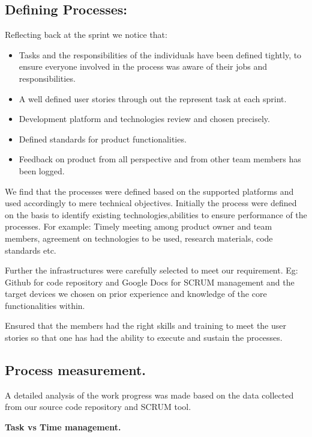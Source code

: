 \subsection{Defining Processes:}

Reflecting back at the sprint we notice that:

\begin{itemize}
	\item Tasks and the responsibilities of the individuals have been defined tightly, to ensure everyone involved in the process was aware  of their jobs and responsibilities.
	\item A well defined user stories through out the represent task at each sprint.
	\item Development platform and technologies review and chosen precisely.
	\item Defined standards for product functionalities.
	\item Feedback on product from all perspective and from other team members has been logged.
\end{itemize}

We find that the processes were defined based on the supported platforms and used accordingly to mere technical objectives. Initially the process were defined on the basis to identify existing technologies,abilities to ensure performance of the processes. For example: Timely meeting among product owner and team members, agreement on technologies to be used, research materials, code standards etc.

Further the infrastructures were carefully selected to meet our requirement.
Eg: Github for code repository and Google Docs for SCRUM management and the target devices we chosen on prior experience and knowledge of the core functionalities within.

Ensured that the members had the right skills and training to meet the user stories so that one has had the ability to execute and sustain the processes.

\subsection{Process measurement.}

A detailed analysis of the work progress was made based on the data collected from our source code repository and SCRUM tool.

\textbf{Task vs Time management.}

